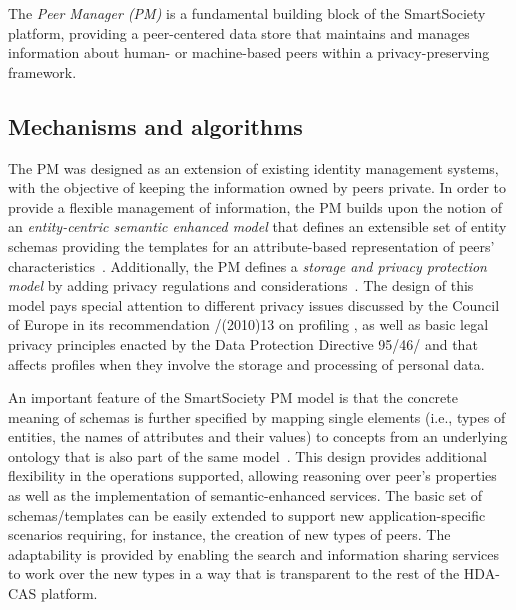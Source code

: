 
The \emph{Peer Manager (PM)} is a fundamental building block of the SmartSociety platform, providing a peer-centered data store that maintains and manages information about human- or machine-based peers within a privacy-preserving framework. 

\subsection{Mechanisms and algorithms}

The PM was designed as an extension of existing identity management systems, with the objective of keeping the information owned by peers private.
In order to provide a flexible management of information, the PM builds upon the notion of an \emph{entity-centric semantic enhanced model} that defines an extensible set of entity schemas providing the templates for an attribute-based representation of peers' characteristics~\cite{Giunchiglia_fromknowledge}. Additionally, the PM defines a \emph{storage and privacy protection model} by adding privacy regulations and considerations~\cite{Hartswood:2015fe}. 
The design of this model pays special attention to different privacy issues discussed by the Council of Europe in its recommendation {}/{}(2010)13 on profiling \cite{CoE2010}, as well as 
basic legal privacy principles enacted by the {} Data Protection Directive 95/46/{} \cite{EUDir95} and that affects profiles when they involve the storage and processing of personal data.

An important feature of the SmartSociety PM model is that the concrete meaning of schemas is further specified by mapping single elements (i.e., types of entities, the names of attributes and their values) to concepts from an underlying ontology that is also part of the same model~\cite{Giunchiglia_fromknowledge}. This design provides additional flexibility in the operations supported, allowing reasoning over peer's properties as well as the implementation of semantic-enhanced services.
%
The basic set of schemas/templates can be easily extended to support new application-specific scenarios requiring, for instance, the creation of new types of peers. The adaptability is provided by enabling the search and information sharing services to work over the new types in a way that is transparent to the rest of the HDA-CAS platform.

